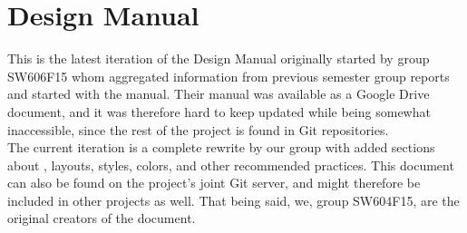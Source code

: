 \chapter{Design Manual}\label{app:design_manual}

This is the latest iteration of the \giraf Design Manual originally started by group SW606F15 whom aggregated information from previous semester group reports and started with the manual. Their manual was available as a Google Drive document, and it was therefore hard to keep updated while being somewhat inaccessible, since the rest of the project is found in Git repositories. \\

The current iteration is a complete rewrite by our group with added sections about \gc, layouts, styles, colors, and other recommended practices. This document can also be found on the project's joint Git server, and might therefore be included in other projects as well. That being said, we, group SW604F15, are the original creators of the document. 

